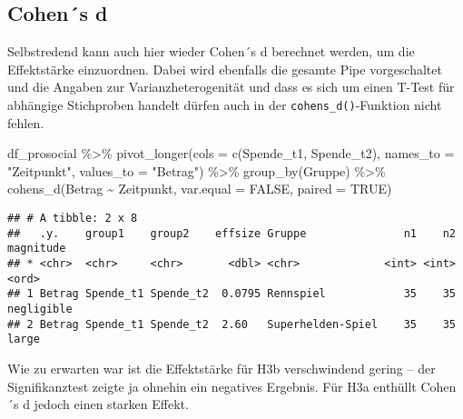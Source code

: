 \documentclass[
]{book}
\newenvironment{Shaded}{\begin{snugshade}}{\end{snugshade}}
\newcommand{\AttributeTok}[1]{\textcolor[rgb]{0.77,0.63,0.00}{#1}}
\newcommand{\ConstantTok}[1]{\textcolor[rgb]{0.00,0.00,0.00}{#1}}
\newcommand{\FunctionTok}[1]{\textcolor[rgb]{0.00,0.00,0.00}{#1}}
\newcommand{\NormalTok}[1]{#1}
\newcommand{\SpecialCharTok}[1]{\textcolor[rgb]{0.00,0.00,0.00}{#1}}
\newcommand{\StringTok}[1]{\textcolor[rgb]{0.31,0.60,0.02}{#1}}
\begin{document}
\hypertarget{cohens-d-2}{%
\subsection{Cohen´s d}\label{cohens-d-2}}

Selbstredend kann auch hier wieder Cohen´s d berechnet werden, um die Effektstärke einzuordnen. Dabei wird ebenfalls die gesamte Pipe vorgeschaltet und die Angaben zur Varianzheterogenität und dass es sich um einen T-Test für abhängige Stichproben handelt dürfen auch in der \texttt{cohens\_d()}-Funktion nicht fehlen.

\begin{Shaded}
\begin{Highlighting}[]
\NormalTok{df\_prosocial }\SpecialCharTok{\%\textgreater{}\%}
      \FunctionTok{pivot\_longer}\NormalTok{(}\AttributeTok{cols =} \FunctionTok{c}\NormalTok{(Spende\_t1, Spende\_t2), }
                   \AttributeTok{names\_to =} \StringTok{"Zeitpunkt"}\NormalTok{, }
                   \AttributeTok{values\_to =} \StringTok{"Betrag"}\NormalTok{) }\SpecialCharTok{\%\textgreater{}\%} 
      \FunctionTok{group\_by}\NormalTok{(Gruppe) }\SpecialCharTok{\%\textgreater{}\%} 
      \FunctionTok{cohens\_d}\NormalTok{(Betrag }\SpecialCharTok{\textasciitilde{}}\NormalTok{ Zeitpunkt, }
             \AttributeTok{var.equal =} \ConstantTok{FALSE}\NormalTok{, }
             \AttributeTok{paired =} \ConstantTok{TRUE}\NormalTok{) }
\end{Highlighting}
\end{Shaded}

\begin{verbatim}
## # A tibble: 2 x 8
##   .y.    group1    group2    effsize Gruppe               n1    n2 magnitude 
## * <chr>  <chr>     <chr>       <dbl> <chr>             <int> <int> <ord>     
## 1 Betrag Spende_t1 Spende_t2  0.0795 Rennspiel            35    35 negligible
## 2 Betrag Spende_t1 Spende_t2  2.60   Superhelden-Spiel    35    35 large
\end{verbatim}

Wie zu erwarten war ist die Effektstärke für H3b verschwindend gering -- der Signifikanztest zeigte ja ohnehin ein negatives Ergebnis. Für H3a enthüllt Cohen´s d jedoch einen starken Effekt.

  
\end{document}
